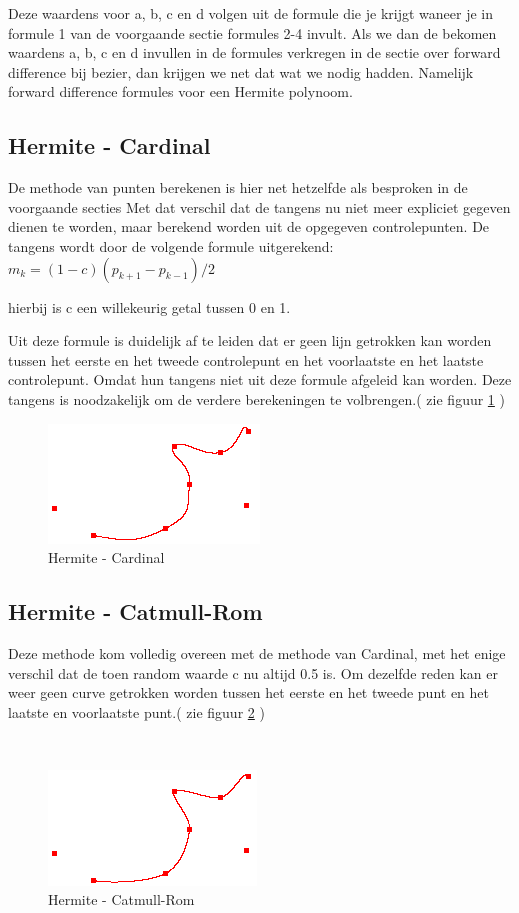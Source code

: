 \documentclass[a4paper,11pt,oneside, titlepage]{article}
\begin{document}
Deze waardens voor a, b, c en d volgen uit de formule die je krijgt waneer je in formule 1 van de voorgaande sectie formules 2-4 invult.
Als we dan de bekomen waardens a, b, c en d invullen in de formules verkregen in de sectie
over forward difference bij bezier, dan krijgen we net dat wat we nodig hadden. Namelijk
forward difference formules voor een Hermite polynoom.
\subsection{Hermite - Cardinal}
De methode van punten berekenen is hier net hetzelfde als besproken in de voorgaande secties
Met dat verschil dat de tangens nu niet meer expliciet gegeven dienen te worden, maar 
berekend worden uit de opgegeven controlepunten. 
De tangens wordt door de volgende formule uitgerekend:\newline 
$m_k = (1 - c)(p_{k+1} -p_{k-1})/2$

hierbij is c een willekeurig getal tussen 0 en 1.

Uit deze formule is duidelijk af te leiden dat er geen lijn getrokken kan worden 
tussen het eerste en het tweede controlepunt en het voorlaatste en het laatste controlepunt. 
Omdat hun tangens niet uit deze formule afgeleid kan worden. Deze tangens is noodzakelijk
om de verdere berekeningen te volbrengen.( zie figuur \ref{cardinal} )
\begin{figure}[htbp]
\begin{center}
\includegraphics[scale=0.4]{./screenies2/cardinal.png}
\caption{Hermite - Cardinal}\label{cardinal}
\end{center}
\end{figure}
\subsection{Hermite - Catmull-Rom}
Deze methode kom volledig overeen met de methode van Cardinal, met het enige verschil dat
de toen random waarde c nu altijd 0.5 is. Om dezelfde reden kan er weer geen curve getrokken
worden tussen het eerste en het tweede punt en het laatste en voorlaatste punt.( zie figuur
\ref{catmull} )
\begin{figure}[htbp]\
\begin{center}
\includegraphics[scale=0.4]{./screenies2/catmull.png}
\caption{Hermite - Catmull-Rom}\label{catmull}
\end{center}
\end{figure}
\end{document}
